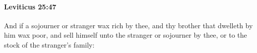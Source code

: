 
		\paragraph{Leviticus 25:47} %
			\label{LEVITICUS-25-47}

			And if a sojourner or stranger wax rich by thee, and thy brother that dwelleth by him wax poor, and sell himself unto the stranger or sojourner by thee, or to the stock of the stranger’s family:


